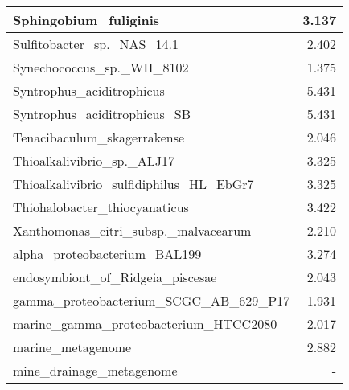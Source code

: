 \documentclass[12pt,a4paper]{article}
\begin{document}
\begin{table}[ht]
\begin{center}
\begin{tabular}{|l*{1}{|r}|}
Sphingobium\_fuliginis & 3.137 \\ \hline
Sulfitobacter\_sp.\_NAS\_14.1 & 2.402 \\ \hline
Synechococcus\_sp.\_WH\_8102 & 1.375 \\ \hline
Syntrophus\_aciditrophicus & 5.431 \\ \hline
Syntrophus\_aciditrophicus\_SB & 5.431 \\ \hline
Tenacibaculum\_skagerrakense & 2.046 \\ \hline
Thioalkalivibrio\_sp.\_ALJ17 & 3.325 \\ \hline
Thioalkalivibrio\_sulfidiphilus\_HL\_EbGr7 & 3.325 \\ \hline
Thiohalobacter\_thiocyanaticus & 3.422 \\ \hline
Xanthomonas\_citri\_subsp.\_malvacearum & 2.210 \\ \hline
alpha\_proteobacterium\_BAL199 & 3.274 \\ \hline
endosymbiont\_of\_Ridgeia\_piscesae & 2.043 \\ \hline
gamma\_proteobacterium\_SCGC\_AB\_629\_P17 & 1.931 \\ \hline
marine\_gamma\_proteobacterium\_HTCC2080 & 2.017 \\ \hline
marine\_metagenome & 2.882 \\ \hline
mine\_drainage\_metagenome & - \\ \hline
\end{tabular}
\end{center}
\end{table}
\end{document}

